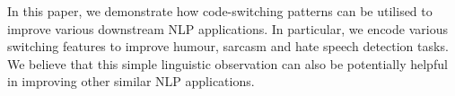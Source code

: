In this paper, we demonstrate how code-switching patterns can be utilised to improve various downstream NLP applications.  In particular, we encode various switching features to improve humour, sarcasm and hate speech detection tasks. We believe that this simple linguistic observation can also be potentially helpful in improving other similar NLP applications.
